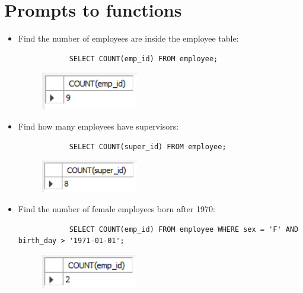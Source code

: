 \section{Prompts to functions}
\begin{itemize}
    \item Find the number of employees are inside the employee table:
        \begin{verbatim}
            SELECT COUNT(emp_id) FROM employee;
        \end{verbatim}
        \begin{figure}[H]
            \centering
            \includegraphics[width=0.4\textwidth]{./Figs/2020-12-24-20-58-35.png}
        \end{figure}
    
    \item Find how many employees have supervisors:
        \begin{verbatim}
            SELECT COUNT(super_id) FROM employee;
        \end{verbatim}
        \begin{figure}[H]
            \centering
            \includegraphics[width=0.4\textwidth]{./Figs/2020-12-24-20-53-55.png}
        \end{figure}
    
    \item Find the number of female employees born after 1970:
        \begin{verbatim}
            SELECT COUNT(emp_id) FROM employee WHERE sex = 'F' AND birth_day > '1971-01-01';
        \end{verbatim}
        \begin{figure}[H]
            \centering
            \includegraphics[width=0.4\textwidth]{./Figs/2020-12-24-20-57-32.png}
        \end{figure}
    

\end{itemize}

